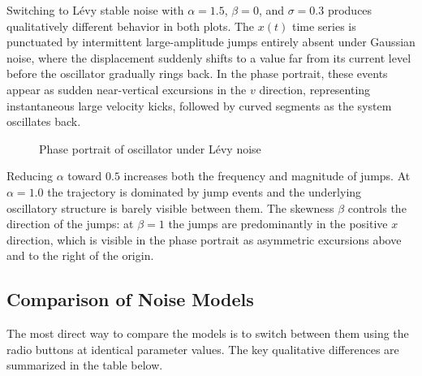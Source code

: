 \documentclass[12pt]{article}
\begin{document}
Switching to L\'{e}vy stable noise with $\alpha = 1.5$, $\beta = 0$, and
$\sigma = 0.3$ produces qualitatively different behavior in both plots.
The $x(t)$ time series is punctuated by intermittent large-amplitude jumps
entirely absent under Gaussian noise, where the displacement suddenly shifts
to a value far from its current level before the oscillator gradually rings
back. In the phase portrait, these events appear as sudden near-vertical
excursions in the $v$ direction, representing instantaneous large velocity
kicks, followed by curved segments as the system oscillates back.

\begin{figure}[H]
    \centering
        \begin{minipage}{0.48\textwidth}
        \centering
        
        \caption{Displacement of oscillator under L\'evy noise}
    \end{minipage}
    \hfill
    \begin{minipage}{0.48\textwidth}
        \centering
        
        \caption{Phase portrait of oscillator under L\'evy noise}
    \end{minipage}
\end{figure}

Reducing $\alpha$ toward $0.5$ increases both the frequency and magnitude of
jumps. At $\alpha = 1.0$ the trajectory is dominated by jump events and the
underlying oscillatory structure is barely visible between them. The skewness
$\beta$ controls the direction of the jumps: at $\beta = 1$ the jumps
are predominantly in the positive $x$ direction, which is visible in the
phase portrait as asymmetric excursions above and to the right of the origin.

\subsection{Comparison of Noise Models}

The most direct way to compare the models is to switch between them using
the radio buttons at identical parameter values. The key qualitative
differences are summarized in the table below.
\end{document}

